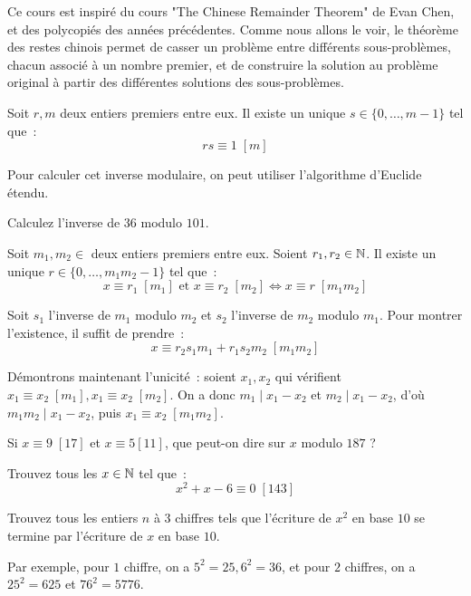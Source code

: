 Ce cours est inspiré du cours "The Chinese Remainder Theorem" de Evan Chen, et des polycopiés des années précédentes.
Comme nous allons le voir, le théorème des restes chinois permet de casser un problème entre différents sous-problèmes, chacun associé à un nombre premier, et de construire la solution au problème original à partir des différentes solutions des sous-problèmes.

\begin{thm}
Soit $r, m$ deux entiers premiers entre eux.
Il existe un unique $s \in \{0, \dots, m - 1\}$ tel que~:
$$rs \equiv 1 \; [m]$$
\end{thm}

Pour calculer cet inverse modulaire, on peut utiliser l'algorithme d'Euclide étendu.

\begin{exo}
Calculez l'inverse de $36$ modulo $101$.
\end{exo}

\begin{thm}
Soit $m_1, m_2 \in $ deux entiers premiers entre eux.
Soient $r_1, r_2 \in \mathbb N$. Il existe un unique $r \in \{0, \dots, m_1m_2 - 1\}$ tel que~:
$$x \equiv r_1 \; [m_1] \mbox{ et } x \equiv r_2 \; [m_2] \iff x \equiv r \; [m_1 m_2]$$
\end{thm}
\begin{preuve}
Soit $s_1$ l'inverse de $m_1$ modulo $m_2$ et $s_2$ l'inverse de $m_2$ modulo $m_1$.
Pour montrer l'existence, il suffit de prendre~:
$$x \equiv r_2 s_1 m_1 + r_1 s_2 m_2 \; [m_1m_2]$$

Démontrons maintenant l'unicité~:
soient $x_1, x_2$ qui vérifient $x_1 \equiv x_2 \; [m_1], x_1 \equiv x_2 \; [m_2]$.
On a donc $m_1 \;|\; x_1 - x_2$ et $m_2 \;|\; x_1 - x_2$, d'où $m_1m_2 \;|\; x_1 - x_2$, puis $x_1 \equiv x_2 \; [m_1m_2]$.
\end{preuve}

\begin{exo}
Si $x \equiv 9 \; [17]$ et $x \equiv 5 [11]$, que peut-on dire sur $x$ modulo $187$ ?
\end{exo}

\begin{exo}
Trouvez tous les $x \in \mathbb N$ tel que~:
$$x^2 + x - 6 \equiv 0 \; [143]$$
\end{exo}

\begin{exo}
Trouvez tous les entiers $n$ à $3$ chiffres tels que l'écriture de $x^2$ en base $10$ se termine par l'écriture de $x$ en base $10$.

Par exemple, pour $1$ chiffre, on a $5^2 = 25, 6^2 = 36$, et pour $2$ chiffres, on a $25^2 = 625$ et $76^2 = 5776$.
\end{exo}

